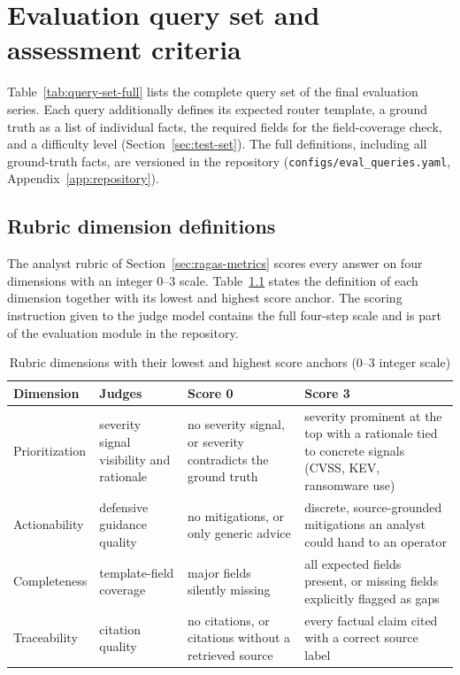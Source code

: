 \chapter{Evaluation query set and assessment criteria}
\label{app:query-set}

Table~\ref{tab:query-set-full} lists the complete query set of the
final evaluation series. Each query additionally defines its expected
router template, a ground truth as a list of individual facts, the
required fields for the field-coverage check, and a difficulty level
(Section~\ref{sec:test-set}). The full definitions, including all
ground-truth facts, are versioned in the repository
(\texttt{configs/eval\_queries.yaml},
Appendix~\ref{app:repository}).

\begingroup
\small

\endgroup

\section*{Rubric dimension definitions}

The analyst rubric of Section~\ref{sec:ragas-metrics} scores every
answer on four dimensions with an integer 0--3 scale.
Table~\ref{tab:rubric-definitions} states the definition of each
dimension together with its lowest and highest score anchor. The
scoring instruction given to the judge model contains the full
four-step scale and is part of the evaluation module in the
repository.

\begin{table}[H]
    \centering
    \small
    \begin{tabular}{lp{}p{}p{}}
        \toprule
        \textbf{Dimension} & \textbf{Judges} & \textbf{Score 0} &
        \textbf{Score 3} \\
        \midrule
        Prioritization & severity signal visibility and rationale &
            no severity signal, or severity contradicts the ground
            truth &
            severity prominent at the top with a rationale tied to
            concrete signals (CVSS, KEV, ransomware use) \\
        Actionability & defensive guidance quality &
            no mitigations, or only generic advice &
            discrete, source-grounded mitigations an analyst could
            hand to an operator \\
        Completeness & template-field coverage &
            major fields silently missing &
            all expected fields present, or missing fields explicitly
            flagged as gaps \\
        Traceability & citation quality &
            no citations, or citations without a retrieved source &
            every factual claim cited with a correct source label \\
        \bottomrule
    \end{tabular}
    \caption{Rubric dimensions with their lowest and highest score
             anchors (0--3 integer scale)}
    \label{tab:rubric-definitions}
\end{table}
